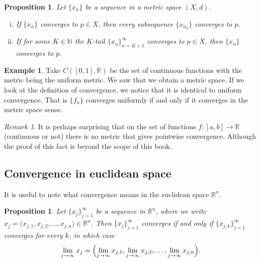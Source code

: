 \documentclass[12pt]{book}
\newcommand{\R}{{\mathbb{R}}}
\newcommand{\N}{{\mathbb{N}}}
\theoremstyle{plain}
\newtheorem{prop}[thm]{Proposition}
\theoremstyle{remark}
\newtheorem{remark}[thm]{Remark}
\theoremstyle{definition}
\theoremstyle{exercise}
\theoremstyle{example}
\newtheorem{example}[thm]{Example}
\begin{document}
\begin{prop} \label{prop:mssubseq}
Let $\{ x_n \}$ be a sequence in a metric space $(X,d)$.
\begin{enumerate}[(i)]
\item If $\{ x_n \}$ converges to $p \in X$, then every subsequence $\{ x_{n_k} \}$
converges to $p$.
\item If for some $K \in \N$ the $K$-tail $\{ x_n \}_{n=K+1}^\infty$
converges to $p \in X$, then
 $\{ x_n \}$ converges to $p$.
\end{enumerate}
\end{prop}

\begin{example}
Take $C([0,1],\R)$ be the set of continuous functions with the metric being
the uniform metric.  We saw that we obtain a metric space.
If we look at the definition of convergence, we notice that it is identical
to uniform convergence.  That is $\{ f_n \}$ converges uniformly if and only
if it converges in the metric space sense.
\end{example}

\begin{remark}
It is perhaps surprising that on the set of functions $f \colon [a,b] \to
\R$ (continuous or not)
there is no metric that gives pointwise convergence.  Although the proof of
this fact is beyond the scope of this book.
\end{remark}

\subsection{Convergence in euclidean space}

It is useful to note what convergence means in the euclidean space
$\R^n$.

\begin{prop} \label{prop:msconveuc}
Let $\{ x_j \}_{j=1}^\infty$ be a sequence in $\R^n$,
where we write $x_j = \bigl(x_{j,1},x_{j,2},\ldots,x_{j,n}\bigr) \in \R^n$.
Then $\{ x_j \}_{j=1}^\infty$ converges if and only if
$\{ x_{j,k} \}_{j=1}^\infty$ converges for every $k$, in which case
\begin{equation*}
\lim_{j\to\infty}
x_j =
\Bigl(
\lim_{j\to\infty} x_{j,1},
\lim_{j\to\infty} x_{j,2},
\ldots,
\lim_{j\to\infty} x_{j,n}
\Bigr) .
\end{equation*}
\end{prop}
\end{document}
